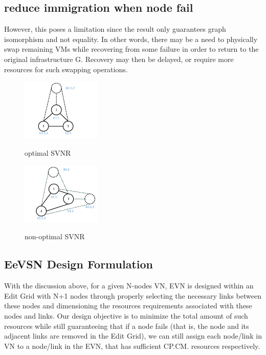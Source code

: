 \subsection{reduce immigration when node fail}
However, this poses a limitation since the result only guarantees graph isomorphism and not equality. In other words, there may be a need to physically swap remaining VMs while recovering from some failure in order to return to the original infrastructure G. Recovery may then be delayed, or require more resources for such swapping operations.

\begin{figure}
\centering
\includegraphics[width=1.5in]{Fig/optgraph_SVNR}\\
\caption{optimal SVNR}\label{fig:optgraphsvnr}
\end{figure}
\begin{figure}
\centering
\includegraphics[width=1.5in]{Fig/nonoptgraph_SVNR}\\
\caption{non-optimal SVNR}\label{fig:nonoptgraphsvnr}
\end{figure}


\subsection{EeVSN Design Formulation}
With the discussion above, for a given N-nodes VN, EVN is designed within an Edit Grid with N+1 nodes through properly
selecting the necessary links between these nodes and dimensioning the resources requirements associated with these nodes
and links. Our design objective is to minimize the total amount of such resources while still guaranteeing that if a node fails
(that is, the node and its adjacent links are removed in the Edit Grid), we can still assign each node/link in VN to a node/link in
the EVN, that has sufficient CP.CM. resources respectively.

